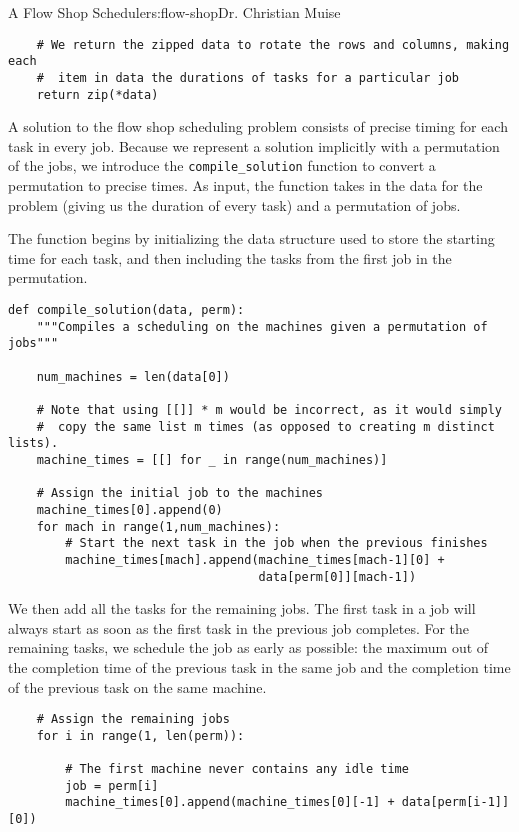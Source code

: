 \begin{aosachapter}{A Flow Shop Scheduler}{s:flow-shop}{Dr. Christian Muise}
\begin{verbatim}
    # We return the zipped data to rotate the rows and columns, making each
    #  item in data the durations of tasks for a particular job
    return zip(*data)
\end{verbatim}

\label{compiling-solutions}

A solution to the flow shop scheduling problem consists of precise
timing for each task in every job. Because we represent a solution
implicitly with a permutation of the jobs, we introduce the
\texttt{compile\_solution} function to convert a permutation to precise
times. As input, the function takes in the data for the problem (giving
us the duration of every task) and a permutation of jobs.

The function begins by initializing the data structure used to store the
starting time for each task, and then including the tasks from the first
job in the permutation.

\begin{verbatim}
def compile_solution(data, perm):
    """Compiles a scheduling on the machines given a permutation of jobs"""

    num_machines = len(data[0])

    # Note that using [[]] * m would be incorrect, as it would simply
    #  copy the same list m times (as opposed to creating m distinct lists).
    machine_times = [[] for _ in range(num_machines)]

    # Assign the initial job to the machines
    machine_times[0].append(0)
    for mach in range(1,num_machines):
        # Start the next task in the job when the previous finishes
        machine_times[mach].append(machine_times[mach-1][0] +
                                   data[perm[0]][mach-1])
\end{verbatim}

We then add all the tasks for the remaining jobs. The first task in a
job will always start as soon as the first task in the previous job
completes. For the remaining tasks, we schedule the job as early as
possible: the maximum out of the completion time of the previous task in
the same job and the completion time of the previous task on the same
machine.

\begin{verbatim}
    # Assign the remaining jobs
    for i in range(1, len(perm)):

        # The first machine never contains any idle time
        job = perm[i]
        machine_times[0].append(machine_times[0][-1] + data[perm[i-1]][0])


\end{verbatim}
\end{aosachapter}
